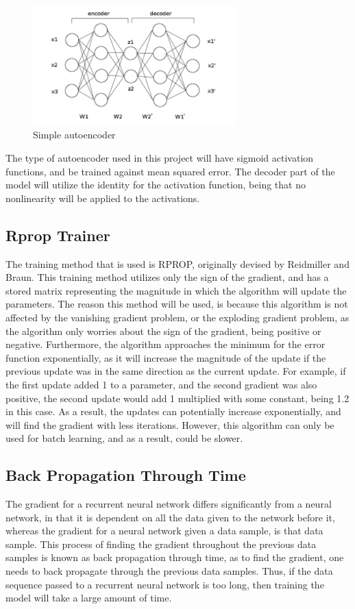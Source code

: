 \documentclass{article}
\begin{document}
\begin{figure}[H]
	\centering
	\caption{Simple autoencoder}
	\includegraphics[width=0.7\textwidth]{autoencoderDiagram.jpg}
\end{figure}

The type of autoencoder used in this project will have sigmoid activation
functions, and be trained against mean squared error. The decoder part of the
model will utilize the identity for the activation function, being that no
nonlinearity will be applied to the activations.

\subsection{Rprop Trainer}
The training method that is used is RPROP, originally devised by Reidmiller and
Braun. This training method utilizes only the sign of the gradient, and has a
stored matrix representing the magnitude in which the algorithm will update the
parameters. The reason this method will be used, is because this algorithm is
not affected by the vanishing gradient problem, or the exploding gradient
problem, as the algorithm only worries about the sign of the gradient, being
positive or negative. Furthermore, the algorithm approaches the minimum for the
error function exponentially, as it will increase the magnitude of the update
if the previous update was in the same direction as the current update. For
example, if the first update added 1 to a parameter, and the second gradient was
also positive, the second update would add 1 multiplied with some constant,
being 1.2 in this case. As a result, the updates can potentially increase
exponentially, and will find the gradient with less iterations. However, this
algorithm can only be used for batch learning, and as a result, could be slower.

\subsection{Back Propagation Through Time}
The gradient for a recurrent neural network differs significantly from a neural
network, in that it is dependent on all the data given to the network before it,
whereas the gradient for a neural network given a data sample, is that data
sample. This process of finding the gradient throughout the previous data
samples is known as back propagation through time, as to find the gradient, one
needs to back propagate through the previous data samples. Thus, if the data
sequence passed to a recurrent neural network is too long, then training the
model will take a large amount of time.
\end{document}
